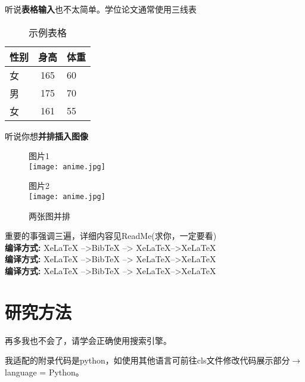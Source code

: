 \documentclass[AutoFakeBold]{LZUthesis}
\begin{document}
\par 听说\textbf{表格输入}也不太简单。学位论文通常使用三线表
\begin{table}[htbp] 
	\centering	
	\begin{tabular}{lcl} 
		\toprule 
		性别 & 身高 & 体重 \\ 
		\midrule 
		 女 & 165 & 60 \\ 
	     男 & 175 & 70 \\ 
		 女 & 161 & 55 \\ 
		\bottomrule 
	\end{tabular} 
\caption{\label{tab:test}示例表格} 
\end{table}
\par 听说你想\textbf{并排插入图像}
\begin{figure}[H]
	\begin{minipage}[t]{0.5\textwidth}
	\centering
	\tiny 图片1 \\
	\vspace{0.5cm}
	\texttt{[image: anime.jpg]}
\end{minipage}
\begin{minipage}[t]{0.5\textwidth}
	\centering 
	\tiny 图片2 \\
	\vspace{0.5cm}
	\texttt{[image: anime.jpg]}  
\end{minipage}	
\protect\caption{两张图并排 \label {fig:two-pics}}	
\end{figure}

\par 重要的事强调三遍，详细内容见ReadMe(求你，一定要看) \\
{\bfseries 编译方式:} XeLaTeX -->BibTeX --> XeLaTeX-->XeLaTeX \\
{\bfseries 编译方式:} XeLaTeX -->BibTeX --> XeLaTeX-->XeLaTeX \\
{\bfseries 编译方式:} XeLaTeX -->BibTeX --> XeLaTeX-->XeLaTeX
\chapter{研究方法}
\par 再多我也不会了，请学会正确使用搜索引擎。
\par 我适配的附录代码是python，如使用其他语言可前往cls文件修改代码展示部分$\rightarrow$language = Python。
\end{document}
